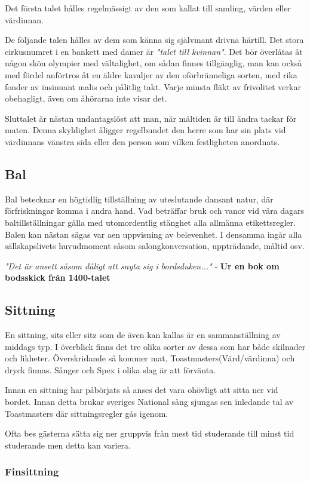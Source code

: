 Det första talet hålles regelmässigt av den som kallat till samling, värden eller värdinnan.

De följande talen hålles av dem som känna sig självmant drivna härtill. Det stora cirkusnumret i en bankett med damer är \textit{"talet till kvinnan"}. Det bör överlåtas åt någon skön olympier med vältalighet, om sådan finnes tillgänglig, man kan också med fördel anförtros åt en äldre kavaljer av den oförbränneliga sorten, med rika fonder av insinuant malis och pålitlig takt. Varje minsta fläkt av frivolitet verkar obehagligt, även om åhörarna inte visar det.

Sluttalet är nästan undantagslöst att man, när måltiden är till ändra tackar för maten. Denna skyldighet åligger regelbundet den herre som har sin plats vid värdinnans vänstra sida eller den person som vilken festligheten anordnats.
\filbreak
\subsection{Bal}
Bal betecknar en högtidlig tillställning av uteslutande dansant natur, där förfriskningar komma i andra hand. Vad beträffar bruk och vanor vid våra dagars baltillställningar gälla med utomordentlig stänghet alla allmänna etikettsregler. Balen kan nästan sägas var aen uppvisning av belevenhet. I densamma ingår alla sällskapslivets huvudmoment såsom salongkonversation, uppträdande, måltid osv.

\textit{"Det är ansett såsom dåligt att snyta sig i bordsduken..."} - \textbf{Ur en bok om bodsskick från 1400-talet}
\filbreak
\subsection{Sittning}

En sittning, sits eller sitz som de även kan kallas är en sammanställning av middags typ. I överblick finns det tre olika sorter av dessa som har både skilnader och likheter. Överskridande så kommer mat, Toastmasters(Värd/värdinna) och dryck finnas. Sånger och Spex i olika slag är att förvänta.

Innan en sittning har påbörjats så anses det vara ohövligt att sitta ner vid bordet. Innan detta brukar sveriges National sång sjungas sen inledande tal av Toastmasters där sittningsregler gås igenom. 

Ofta bes gästerna sätta sig ner gruppvis från mest tid studerande till minst tid studerande men detta kan variera.

\subsubsection{Finsittning}

